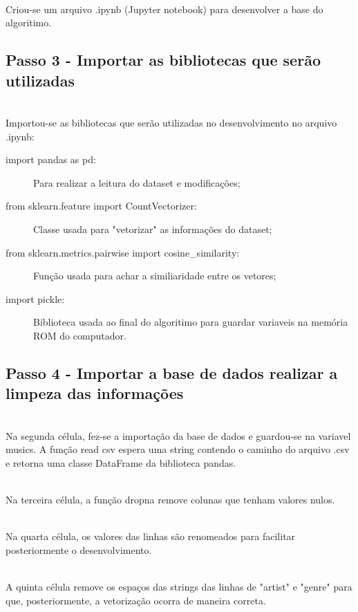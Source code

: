 \documentclass[a4paper, 12pt]{article}
\begin{document}
\\Criou-se um arquivo .ipynb (Jupyter notebook) para desenvolver a base do algoritimo.

\subsection{Passo 3 - Importar as bibliotecas que serão utilizadas}

\\Importou-se as bibliotecas que serão utilizadas no desenvolvimento no arquivo .ipynb:

\begin{itemize}
  \begin{description}
    \item[import pandas as pd:] Para realizar a leitura do dataset e modificações;
    \item[from sklearn.feature import CountVectorizer:] Classe usada para "vetorizar" as informações do dataset;
    \item[from sklearn.metrics.pairwise import cosine_similarity:] Função usada para achar a similiaridade entre os vetores;
    \item[import pickle:] Biblioteca usada ao final do algoritimo para guardar variaveis na memória ROM do computador.
  \end{description}
\end{itemize}

\newpage

\subsection{Passo 4 - Importar a base de dados realizar a limpeza das informações}

\\Na segunda célula, fez-se a importação da base de dados e guardou-se na variavel musics. A função read csv espera uma string contendo o caminho do arquivo .csv e retorna uma classe DataFrame da biblioteca pandas.

\\Na terceira célula, a função dropna remove colunas que tenham valores nulos.

\\Na quarta célula, os valores das linhas são renomeados para facilitar posteriormente o desenvolvimento.

\\A quinta célula remove os espaços das strings das linhas de "artist" e "genre" para que, posteriormente, a vetorização ocorra de maneira correta.
\end{document}
